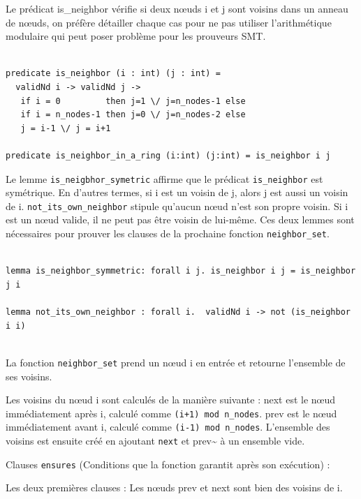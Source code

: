 \documentclass[11pt]{article}
\begin{document}
Le prédicat is\_neighbor vérifie si deux nœuds i et j sont voisins dans un anneau de nœuds, on préfère détailler chaque cas pour ne pas utiliser
l'arithmétique modulaire qui peut poser problème pour les prouveurs SMT.

\lstset{language=why3,label= ,caption= ,captionpos=b,numbers=none}
\begin{lstlisting}

predicate is_neighbor (i : int) (j : int) =
  validNd i -> validNd j ->
   if i = 0         then j=1 \/ j=n_nodes-1 else
   if i = n_nodes-1 then j=0 \/ j=n_nodes-2 else
   j = i-1 \/ j = i+1

predicate is_neighbor_in_a_ring (i:int) (j:int) = is_neighbor i j

\end{lstlisting}


Le lemme \texttt{is\_neigbhor\_symetric} affirme que le prédicat \texttt{is\_neighbor} est symétrique. En d'autres termes, si i est un voisin de j, alors j est aussi un voisin de i.
\texttt{not\_its\_own\_neighbor} stipule qu'aucun nœud n'est son propre voisin. Si i est un nœud valide, il ne peut pas être voisin de lui-même.
Ces deux lemmes sont nécessaires pour prouver les clauses de la prochaine fonction \texttt{neighbor\_set}. 

\lstset{language=why3,label= ,caption= ,captionpos=b,numbers=none}
\begin{lstlisting}

lemma is_neighbor_symmetric: forall i j. is_neighbor i j = is_neighbor j i

lemma not_its_own_neighbor : forall i.  validNd i -> not (is_neighbor i i)


\end{lstlisting}

La fonction \texttt{neighbor\_set} prend un nœud i en entrée et retourne l'ensemble de ses voisins.

Les voisins du nœud i sont calculés de la manière suivante :
    next est le nœud immédiatement après i, calculé comme \texttt{(i+1) mod n\_nodes}.
    prev est le nœud immédiatement avant i, calculé comme \texttt{(i-1) mod n\_nodes}.
L'ensemble des voisins est ensuite créé en ajoutant \texttt{next} et prev\textasciitilde{} à un ensemble vide.

Clauses \texttt{ensures} (Conditions que la fonction garantit après son exécution) :

Les deux premières clauses : Les nœuds prev et next sont bien des voisins de i.
\end{document}
